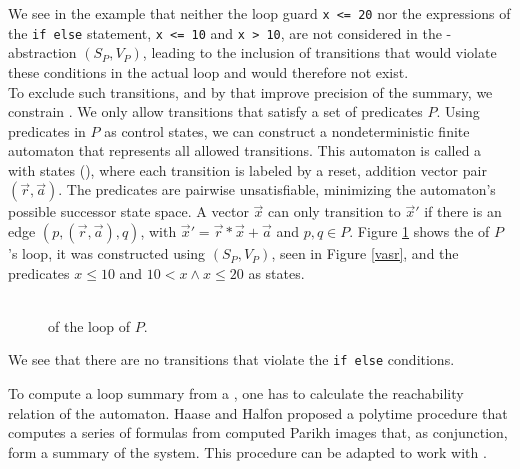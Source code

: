 
\begin{comment}
	\jw{Introduction qvasrs $\rightarrow$ summary precision improvement \\
	- What are qvasr? How to compute their reachability relation $\rightarrow$ Parikh image? \\ 
	How do they improve precision? \\
	- running example to qvasrs \\
	\vspace{1cm}
	15 pages}
\end{comment}

We see in the example that neither the loop guard \texttt{x <= 20} nor the expressions of the \texttt{if else} statement, \texttt{x <= 10} and \texttt{x > 10}, are not considered in the \qvasr-abstraction $(S_P, V_P)$, leading to the inclusion of transitions that would violate these conditions in the actual loop and would therefore not exist. \\
To exclude such transitions, and by that improve precision of the summary, we constrain \qvasr. We only allow transitions that satisfy a set of predicates $P$. Using predicates in $P$ as control states, we can construct a nondeterministic finite automaton that represents all allowed transitions. This automaton is called a \qvasr with states (\qvasrs), where each transition is labeled by a reset, addition vector pair $(\vec{r}, \vec{a})$. The predicates are pairwise unsatisfiable, minimizing the automaton's possible successor state space. A vector $\vec{x}$ can only transition to $\vec{x}'$ if there is an edge $(p, (\vec{r}, \vec{a}), q)$, with $\vec{x}' = \vec{r} * \vec{x} + \vec{a}$ and $p, q \in P$.
Figure \ref{vasrs} shows the \qvasrs of $P$'s loop, it was constructed using $(S_P, V_P)$, seen in Figure \ref{vasr}, and the predicates $x \leq 10$ and $10 < x \land x \leq 20$ as states.
\begin{figure}[H]
	
	\caption{\\ \qvasrs of the loop of $P$.}
	\label{vasrs}
\end{figure}
We see that there are no transitions that violate the \texttt{if else} conditions. \par
To compute a loop summary from a \qvasrs, one has to calculate the reachability relation of the automaton. Haase and Halfon \cite{DBLP:conf/rp/HaaseH14} proposed a polytime procedure that computes a series of formulas from computed Parikh images that, as conjunction, form a summary of the system. This procedure can be adapted to work with \qvasrs. \\ \par